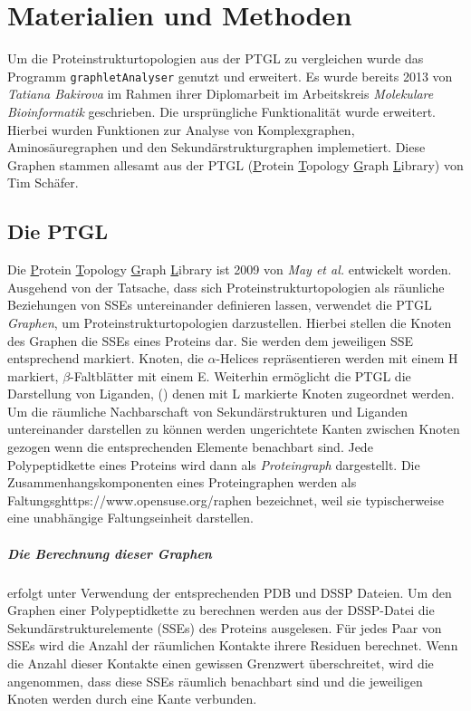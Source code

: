 \documentclass{report}
\begin{document}
\chapter{Materialien und Methoden}

Um die Proteinstrukturtopologien aus der PTGL zu vergleichen wurde das Programm \texttt{graphletAnalyser} genutzt und erweitert. Es wurde bereits 2013 von \textit{Tatiana Bakirova} im Rahmen ihrer Diplomarbeit im Arbeitskreis \textit{Molekulare Bioinformatik} geschrieben. Die urspr\"ungliche Funktionalität wurde erweitert. Hierbei wurden Funktionen zur Analyse von Komplexgraphen, Aminos\"auregraphen und den Sekund\"arstrukturgraphen implemetiert. Diese Graphen stammen allesamt aus der PTGL (\underline{P}rotein \underline{T}opology \underline{G}raph \underline{L}ibrary) von Tim Sch\"afer.


\section{Die PTGL}


Die \underline{P}rotein \underline{T}opology \underline{G}raph \underline{L}ibrary ist 2009 von \textit{May et al.} \cite{ptgl1} entwickelt worden. Ausgehend von der Tatsache, dass sich Proteinstrukturtopologien als r\"aunliche Beziehungen von SSEs untereinander definieren lassen, verwendet die PTGL \emph{Graphen}, um Proteinstrukturtopologien darzustellen.
Hierbei stellen die Knoten des Graphen die SSEs eines Proteins dar. Sie werden dem jeweiligen SSE entsprechend markiert. Knoten, die $\alpha$-Helices repr\"asentieren werden mit einem H markiert, $\beta$-Faltbl\"atter mit einem E. Weiterhin erm\"oglicht die PTGL die Darstellung von Liganden, (\cite{vplg}) denen mit L markierte Knoten zugeordnet werden. Um die r\"aumliche Nachbarschaft von Sekund\"arstrukturen und Liganden untereinander darstellen zu k\"onnen werden ungerichtete Kanten zwischen Knoten gezogen wenn die entsprechenden Elemente benachbart sind. Jede Polypeptidkette eines Proteins wird dann als \emph{Proteingraph} dargestellt. Die Zusammenhangskomponenten eines Proteingraphen werden als Faltungsghttps://www.opensuse.org/raphen bezeichnet, weil sie typischerweise eine unabh\"angige Faltungseinheit darstellen.

\paragraph{Die Berechnung dieser Graphen}

erfolgt unter Verwendung der entsprechenden PDB und DSSP Dateien. Um den Graphen einer Polypeptidkette zu berechnen werden aus der DSSP-Datei die Sekund\"arstrukturelemente (SSEs) des Proteins ausgelesen. F\"ur jedes Paar von SSEs wird die Anzahl der r\"aumlichen Kontakte ihrere Residuen berechnet. Wenn die Anzahl dieser Kontakte einen gewissen Grenzwert \"uberschreitet, wird die angenommen, dass diese SSEs r\"aumlich benachbart sind und die jeweiligen Knoten werden durch eine Kante verbunden.
\end{document}
